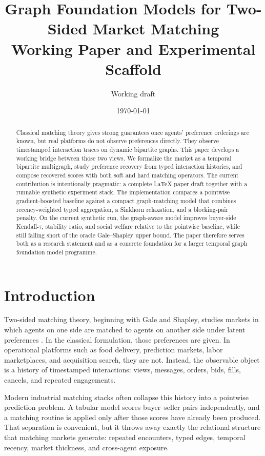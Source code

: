 \documentclass[11pt]{article}
\title{Graph Foundation Models for Two-Sided Market Matching\\
\large Working Paper and Experimental Scaffold}
\author{Working draft}
\date{\today}
\begin{document}
\maketitle

\begin{abstract}
Classical matching theory gives strong guarantees once agents' preference
orderings are known, but real platforms do not observe preferences directly.
They observe timestamped interaction traces on dynamic bipartite graphs. This
paper develops a working bridge between those two views. We formalize the market
as a temporal bipartite multigraph, study preference recovery from typed
interaction histories, and compose recovered scores with both soft and hard
matching operators. The current contribution is intentionally pragmatic: a
complete LaTeX paper draft together with a runnable synthetic experiment stack.
The implementation compares a pointwise gradient-boosted baseline against a
compact graph-matching model that combines recency-weighted typed aggregation, a
Sinkhorn relaxation, and a blocking-pair penalty. On the current synthetic run,
the graph-aware model improves buyer-side Kendall-$\tau$, stability ratio, and
social welfare relative to the pointwise baseline, while still falling short of
the oracle Gale--Shapley upper bound. The paper therefore serves both as a
research statement and as a concrete foundation for a larger temporal graph
foundation model programme.
\end{abstract}

\section{Introduction}

Two-sided matching theory, beginning with Gale and Shapley, studies markets in
which agents on one side are matched to agents on another side under latent
preferences \citep{gale1962college}. In the classical formulation, those
preferences are given. In operational platforms such as food delivery,
prediction markets, labor marketplaces, and acquisition search, they are not.
Instead, the observable object is a history of timestamped interactions:
views, messages, orders, bids, fills, cancels, and repeated engagements.

Modern industrial matching stacks often collapse this history into a pointwise
prediction problem. A tabular model scores buyer--seller pairs independently,
and a matching routine is applied only after those scores have already been
produced. That separation is convenient, but it throws away exactly the
relational structure that matching markets generate: repeated encounters,
typed edges, temporal recency, market thickness, and cross-agent exposure.
\end{document}
